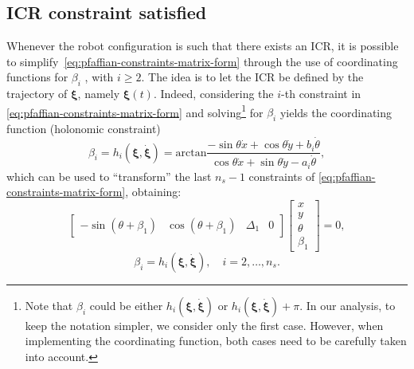 \subsection{ICR constraint satisfied}
\label{sec:icr-constraint-satisfied}
Whenever the robot configuration is such that there exists an ICR, it is possible to simplify~\eqref{eq:pfaffian-constraints-matrix-form} through the use of coordinating functions for $\beta_i$ \cite{RobuffoGiordano2009ICRA}, with $i \ge 2$. The idea is to let the ICR be defined by the trajectory of $\bm{\xi}$, namely $\bm{\xi} \left( t \right)$. Indeed, considering the $i$-th constraint in \eqref{eq:pfaffian-constraints-matrix-form} and solving\footnote{Note that $\beta_i$ could be either $h_i(\bm{\xi}, \dot{\bm{\xi}})$ or $h_i(\bm{\xi}, \dot{\bm{\xi}}) + \pi$. In our analysis, to keep the notation simpler, we consider only the first case. However, when implementing the coordinating function, both cases need to be carefully taken into account.} for $\beta_i$ yields the coordinating function (holonomic constraint)
\begin{equation}
    \label{eq:coordinating-function-pre-kinematic-model}
    \beta_i = h_i(\bm{\xi}, \dot{\bm{\xi}}) = \mathrm{arctan} \frac{-\sin\theta\dot{x}+\cos\theta\dot{y}+b_i\dot{\theta}}{\cos\theta\dot{x}+\sin\theta\dot{y}-a_i\dot{\theta}},
\end{equation}
which can be used to ``transform'' the last $n_s-1$ constraints of \eqref{eq:pfaffian-constraints-matrix-form}, obtaining:
\begin{equation}
    \label{eq:reduced-pfaffian-constraints-matrix-form}
    \begin{bmatrix}
        -\sin(\theta + \beta_1) &
        \cos(\theta + \beta_1) &
        \Delta_1 &
        0
    \end{bmatrix}
    \begin{bmatrix}
        x \\ y \\ \theta \\ \beta_1
    \end{bmatrix}
    = 0,
\end{equation}
\begin{equation*}
    \beta_i = h_i(\bm{\xi}, \dot{\bm{\xi}}), \quad i = 2, \dots, n_s.
\end{equation*}

